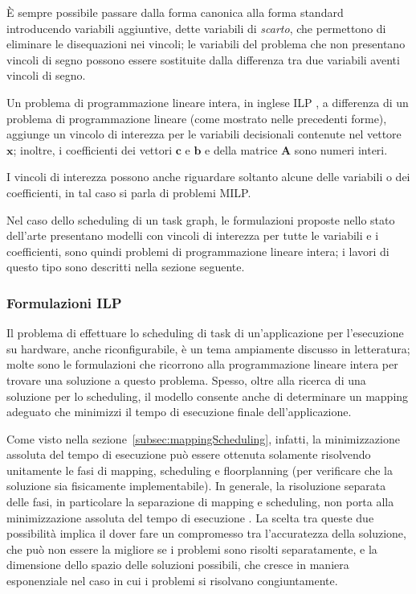 È sempre possibile passare dalla forma canonica alla forma standard 
introducendo variabili aggiuntive, dette variabili di \emph{scarto}, che 
permettono di eliminare le disequazioni nei vincoli; le variabili del problema 
che non presentano vincoli di segno possono essere sostituite dalla differenza 
tra due variabili aventi vincoli di segno.

Un problema di programmazione lineare intera, in inglese \ac{ILP}
\cite{ILPBook}, a differenza di un problema di programmazione lineare (come mostrato
nelle precedenti forme), aggiunge un vincolo di interezza per le variabili decisionali
contenute nel vettore $\mathbf{x}$; inoltre, i coefficienti dei vettori $\mathbf{c}$
e $\mathbf{b}$ e della matrice $\mathbf{A}$ sono numeri interi.

I vincoli di interezza possono anche riguardare soltanto alcune delle variabili o 
dei coefficienti, in tal caso si parla di problemi \ac{MILP}.

Nel caso dello scheduling di un task graph, le formulazioni proposte nello 
stato dell'arte presentano modelli con vincoli di interezza per tutte le 
variabili e i coefficienti, sono quindi problemi di programmazione lineare 
intera; i lavori di questo tipo sono descritti nella sezione seguente.


\subsubsection{Formulazioni \acs{ILP}}
Il problema di effettuare lo scheduling di task di un'applicazione per 
l'esecuzione su hardware, anche riconfigurabile, è un tema ampiamente discusso 
in letteratura; molte sono le formulazioni che ricorrono alla programmazione 
lineare intera per trovare una soluzione a questo problema. Spesso, oltre alla 
ricerca di una soluzione per lo scheduling, il modello consente anche di 
determinare un mapping adeguato che minimizzi il tempo di esecuzione finale
dell'applicazione.

Come visto nella sezione~\ref{subsec:mappingScheduling}, infatti, la minimizzazione assoluta 
del tempo di esecuzione può essere ottenuta solamente risolvendo unitamente le 
fasi di mapping, scheduling e floorplanning (per verificare che la soluzione 
sia fisicamente implementabile). In generale, la risoluzione separata delle fasi, in 
particolare la separazione di mapping e scheduling, non porta alla 
minimizzazione assoluta del tempo di esecuzione \cite{AntColonyOptimization}. La scelta tra queste due 
possibilità implica il dover fare un compromesso tra l'accuratezza della 
soluzione, che può non essere la migliore se i problemi sono risolti 
separatamente, e la dimensione dello spazio delle soluzioni possibili, che 
cresce in maniera esponenziale nel caso in cui i problemi si risolvano congiuntamente.

